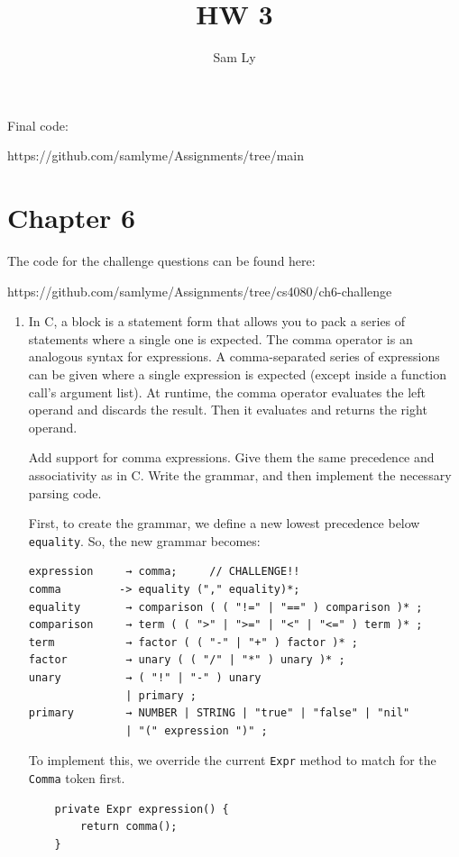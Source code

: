 \documentclass{article}
\title{HW 3}
\author{Sam Ly}
\begin{document}
\maketitle

Final code:

https://github.com/samlyme/Assignments/tree/main

\section*{Chapter 6}

The code for the challenge questions can be found here: 

https://github.com/samlyme/Assignments/tree/cs4080/ch6-challenge

\begin{enumerate}
    \item 
        In C, a block is a statement form that allows you to pack a series of 
        statements where a single one is expected. The comma operator is an 
        analogous syntax for expressions. A comma-separated series of expressions
        can be given where a single expression is expected (except inside a function 
        call’s argument list). At runtime, the comma operator evaluates the left 
        operand and discards the result. Then it evaluates and returns the right
        operand.

        Add support for comma expressions. Give them the same precedence and 
        associativity as in C. Write the grammar, and then implement the 
        necessary parsing code.

        First, to create the grammar, we define a new lowest precedence below
        \verb|equality|. So, the new grammar becomes:
        \begin{verbatim}
expression     → comma;     // CHALLENGE!!
comma         -> equality ("," equality)*;
equality       → comparison ( ( "!=" | "==" ) comparison )* ;
comparison     → term ( ( ">" | ">=" | "<" | "<=" ) term )* ;
term           → factor ( ( "-" | "+" ) factor )* ;
factor         → unary ( ( "/" | "*" ) unary )* ;
unary          → ( "!" | "-" ) unary
               | primary ;
primary        → NUMBER | STRING | "true" | "false" | "nil"
               | "(" expression ")" ;
        \end{verbatim}

        To implement this, we override the current \verb|Expr| method to match 
        for the \verb|Comma| token first.

        \begin{lstlisting}
    private Expr expression() {
        return comma();
    }


\end{lstlisting}
\end{enumerate}
\end{document}
